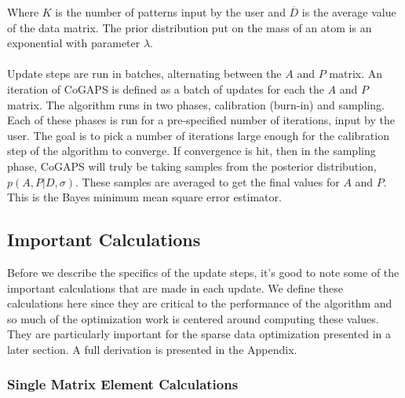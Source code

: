 \documentclass[]{article}
\begin{document}
Where $K$ is the number of patterns input by the user and $\overline{D}$ is the average value of the data matrix. The prior distribution put on the mass of an atom is an exponential with parameter $\lambda$.\\
\\
Update steps are run in batches, alternating between the $A$ and $P$ matrix. An iteration of CoGAPS is defined as a batch of updates for each the $A$ and $P$ matrix. The algorithm runs in two phases, calibration (burn-in) and sampling. Each of these phases is run for a pre-specified number of iterations, input by the user. The goal is to pick a number of iterations large enough for the calibration step of the algorithm to converge. If convergence is hit, then in the sampling phase, CoGAPS will truly be taking samples from the posterior distribution, $p(A,P|D,\sigma)$. These samples are averaged to get the final values for $A$ and $P$. This is the Bayes minimum mean square error estimator. 

\subsection{Important Calculations}

Before we describe the specifics of the update steps, it's good to note some of the important calculations that are made in each update. We define these calculations here since they are critical to the performance of the algorithm and so much of the optimization work is centered around computing these values. They are particularly important for the sparse data optimization presented in a later section. A full derivation is presented in the Appendix.

\subsubsection{Single Matrix Element Calculations}
\end{document}

